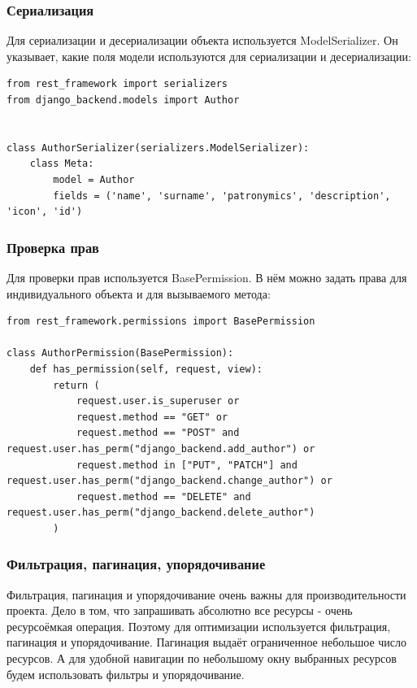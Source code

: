 \documentclass[a4paper,14pt]{extarticle}
\begin{document}
\subsubsection{Сериализация}
Для сериализации и десериализации объекта используется ModelSerializer. 
Он указывает, какие поля модели используются для сериализации и десериализации:
\begin{verbatim}
from rest_framework import serializers
from django_backend.models import Author


class AuthorSerializer(serializers.ModelSerializer):
    class Meta:
        model = Author
        fields = ('name', 'surname', 'patronymics', 'description', 'icon', 'id')

\end{verbatim}

\subsubsection{Проверка прав}
Для проверки прав используется BasePermission. В нём можно задать права для индивидуального
объекта и для вызываемого метода:
\begin{verbatim}
from rest_framework.permissions import BasePermission

class AuthorPermission(BasePermission):
    def has_permission(self, request, view):
        return (
            request.user.is_superuser or
            request.method == "GET" or
            request.method == "POST" and request.user.has_perm("django_backend.add_author") or
            request.method in ["PUT", "PATCH"] and request.user.has_perm("django_backend.change_author") or
            request.method == "DELETE" and request.user.has_perm("django_backend.delete_author")
        )

\end{verbatim}

\subsubsection{Фильтрация, пагинация, упорядочивание}
Фильтрация, пагинация и упорядочивание очень важны для производительности проекта. Дело в том, что
запрашивать абсолютно все ресурсы - очень ресурсоёмкая операция. Поэтому для оптимизации используется 
фильтрация, пагинация и упорядочивание. Пагинация выдаёт ограниченное небольшое число ресурсов. А для 
удобной навигации по небольшому окну выбранных ресурсов будем использовать фильтры и упорядочивание.  
\end{document}
